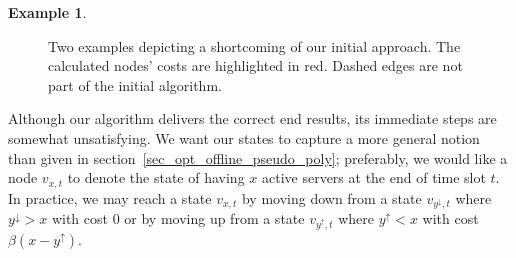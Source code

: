 \documentclass[hidelinks]{article}
\theoremstyle{plain}
\theoremstyle{definition}
\newtheorem{exmpl}[thm]{Example}
\theoremstyle{rem}
\begin{document}
\begin{exmpl}
\begin{figure}[H]
{{ }}
\caption{Two examples depicting a shortcoming of our initial approach. The calculated nodes' costs are highlighted in red. Dashed edges are not part of the initial algorithm.}
\end{figure}
\end{exmpl}
Although our algorithm delivers the correct end results, its immediate steps are somewhat unsatisfying. We want our states to capture a more general notion than given in section~\ref{sec_opt_offline_pseudo_poly}; preferably, we would like a node $v_{x,t}$ to denote the state of having $x$ active servers at the end of time slot $t$. In practice, we may reach a state $v_{x,t}$ by moving down from a state $v_{y^\downarrow,t}$ where $y^\downarrow>x$ with cost $0$ or by moving up from a state $v_{y^\uparrow,t}$ where $y^\uparrow<x$ with cost $\beta(x-y^\uparrow)$.
\end{document}
